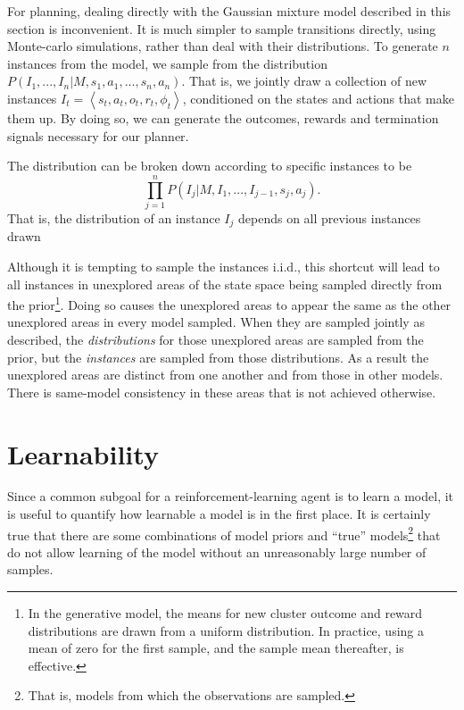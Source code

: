 For planning, dealing directly with the Gaussian mixture model described in this section is inconvenient. It is much simpler to sample transitions directly, using Monte-carlo simulations, rather than deal with their distributions. To generate $n$ instances from the model, we sample from the distribution $P(I_1,...,I_n|M,s_1,a_1,...,s_n,a_n)$. That is, we jointly draw a collection of new instances $I_t=\left<s_t,a_t,o_t,r_t,\phi_t\right>$, conditioned on the states and actions that make them up. By doing so, we can generate the outcomes, rewards and termination signals necessary for our planner.

The distribution can be broken down according to specific instances to be $$\prod_{j=1}^n P(I_j|M,I_1,...,I_{j-1},s_j,a_j).$$ That is, the distribution of an instance $I_j$ depends on all previous instances drawn

Although it is tempting to sample the instances i.i.d., this shortcut will lead to all instances in unexplored areas of the state space being sampled directly from the prior\footnote{In the generative model, the means for new cluster outcome and reward distributions are drawn from a uniform distribution. In practice, using a mean of zero for the first sample, and the sample mean thereafter, is effective.}. Doing so causes the unexplored areas to appear the same as the other unexplored areas in every model sampled. When they are sampled jointly as described, the \emph{distributions} for those unexplored areas are sampled from the prior, but the \emph{instances} are sampled from those distributions. As a result the unexplored areas are distinct from one another and from those in other models. There is same-model consistency in these areas that is not achieved otherwise.



\section{Learnability}


Since a common subgoal for a reinforcement-learning agent is to learn a model, it is useful to quantify how learnable a model is in the first place. It is certainly true that there are some combinations of model priors and ``true'' models\footnote{That is, models from which the observations are sampled.} that do not allow learning of the model without an unreasonably large number of samples.

